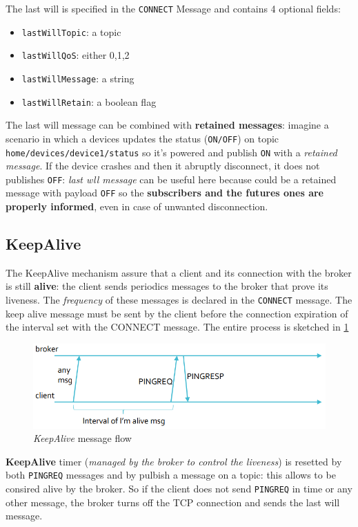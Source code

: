 \documentclass[10pt,a4paper]{report}
\theoremstyle{definition}
\begin{document}
The last will is specified in the \texttt{CONNECT} Message and contains 4 optional fields:
\begin{itemize}
	\item 
	\texttt{lastWillTopic}: a topic
	\item 
	\texttt{lastWillQoS}: either 0,1,2
	\item 
	\texttt{lastWillMessage}: a string
	\item 
	\texttt{lastWillRetain}: a boolean flag
\end{itemize}

The last will message can be combined with \textbf{retained messages}: imagine a scenario in which a devices updates the status (\texttt{ON/OFF}) on topic \texttt{home/devices/device1/status} so it's powered and publish \texttt{ON} with a \textit{retained message}. If the device crashes and then it abruptly disconnect, it does not publishes \texttt{OFF}: \textit{last wll message} can be useful here because could be a retained message with payload \texttt{OFF} so the \textbf{subscribers and the futures ones are properly informed}, even in case of unwanted disconnection.
\subsection{KeepAlive}\label{sec:keepalive}
The KeepAlive mechanism assure that a client and its connection with the broker is still \textbf{alive}: the client sends periodics messages to the broker that prove its liveness. The \textit{frequency} of these messages is declared in the \texttt{CONNECT} message. The keep alive message must be sent by the client before the connection expiration of the interval set with the CONNECT message. The entire process is sketched in \ref{mqtt-keepalive}
\begin{figure}[h]
	\centering\includegraphics[scale=0.50]{images/Pasted image 20230304101151.png}
	\caption{\textit{KeepAlive} message flow}\label{mqtt-keepalive}
\end{figure}

\textbf{KeepAlive} timer (\textit{managed by the broker to control the liveness}) is resetted by both \texttt{PINGREQ} messages and by pulbish a message on a topic: this allows to be consired alive by the broker. So if the client does not send \texttt{PINGREQ} in time or any other message, the broker turns off the TCP connection and sends the last will message.
\end{document}
